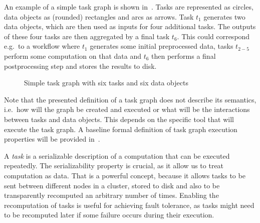 An example of a simple task graph is shown in~. Tasks are represented as
circles, data objects as (rounded) rectangles and arcs as arrows. Task $t_1$
generates two data objects, which are then used as inputs for four additional tasks. The outputs of
these four tasks are then aggregated by a final task $t_6$. This could correspond
e.g.\ to a workflow where $t_1$ generates some initial preprocessed data, tasks
$t_{2-5}$ perform some computation on that data and $t_6$ then
performs a final postprocessing step and stores the results to disk.

\begin{figure}[h]
	\centering
	\caption{Simple task graph with six tasks and six data objects}
	\label{fig:task-graph-example}
\end{figure}

Note that the presented definition of a task graph does not describe its semantics, i.e.\ how will
the graph be created and executed or what will be the interactions between tasks and data objects.
This depends on the specific tool that will execute the task graph. A baseline formal definition of
task graph execution properties will be provided in~.

A \emph{task} is a serializable description of a computation that can be executed
repeatedly. The serializability property is crucial, as it allow us to treat computation as data.
That is a powerful concept, because it allows tasks to be sent between different nodes in a
cluster, stored to disk and also to be transparently recomputed an arbitrary number of times.
Enabling the recomputation of tasks is useful for achieving fault tolerance, as tasks might need to
be recomputed later if some failure occurs during their execution.

